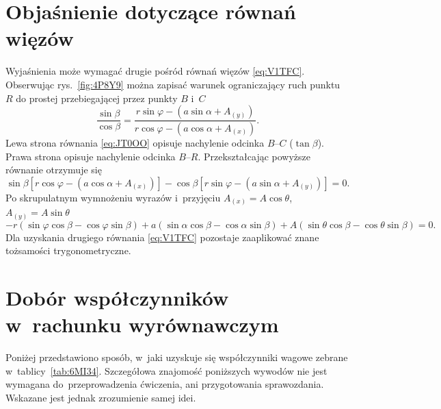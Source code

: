 \documentclass[paper=a4,DIV=12]{tmmlab}
\begin{document}
\begin{appendices}
  \section{Objaśnienie dotyczące równań więzów}
  \label{sec:F6O4D}
  Wyjaśnienia może wymagać drugie pośród równań więzów \eqref{eq:V1TFC}.
  Obserwując rys.~\ref{fig:4P8Y9} można zapisać warunek ograniczający ruch
  punktu $R$ do prostej przebiegającej przez punkty $B$ i~$C$
  \begin{equation}
    \frac{\sin{\beta}}{\cos{\beta}}
  = \frac{r\sin{\varphi} - \left(a\sin{\alpha} + A_{(y)}\right)}
         {r\cos{\varphi} - \left(a\cos{\alpha} + A_{(x)}\right)}.
    \label{eq:JT0OO}
  \end{equation}
  Lewa strona równania \eqref{eq:JT0OO} opisuje nachylenie odcinka $B$--$C$
  ($\tan{\beta}$). Prawa strona opisuje nachylenie odcinka $B$--$R$.
  Przekształcając powyższe równanie otrzymuje się
  \begin{equation}
    \sin{\beta}\left[r \cos{\varphi} - \left(a \cos{\alpha} + A_{(x)}\right)\right]
   -\cos{\beta}\left[r \sin{\varphi} - \left(a \sin{\alpha} + A_{(y)}\right)\right]
   = 0.
    \label{eq:KOLT5}
  \end{equation}
  Po skrupulatnym wymnożeniu wyrazów i~przyjęciu $A_{(x)} = A \cos{\theta}$,
  $A_{(y)} = A\sin{\theta}$
  \begin{equation}
  - r \left(\sin{\varphi} \cos{\beta} - \cos{\varphi}\sin{\beta}\right)
  + a \left(\sin{\alpha}\cos{\beta} - \cos{\alpha}\sin{\beta}\right)
  + A\left(\sin{\theta}\cos{\beta} - \cos{\theta}\sin{\beta}\right) = 0.
    \label{eq:6LMS9}
  \end{equation}
  Dla uzyskania drugiego równania \eqref{eq:V1TFC} pozostaje zaaplikować
  znane tożsamości trygonometryczne.

  \section{Dobór współczynników w~rachunku wyrównawczym}
  \label{sec:J0B6V}
  Poniżej przedstawiono sposób, w~jaki uzyskuje się współczynniki wagowe
  zebrane w~tablicy~\ref{tab:6MI34}. Szczegółowa znajomość poniższych wywodów
  nie jest wymagana do~przeprowadzenia ćwiczenia, ani przygotowania
  sprawozdania. Wskazane jest jednak zrozumienie samej idei.


\end{appendices}
\end{document}

